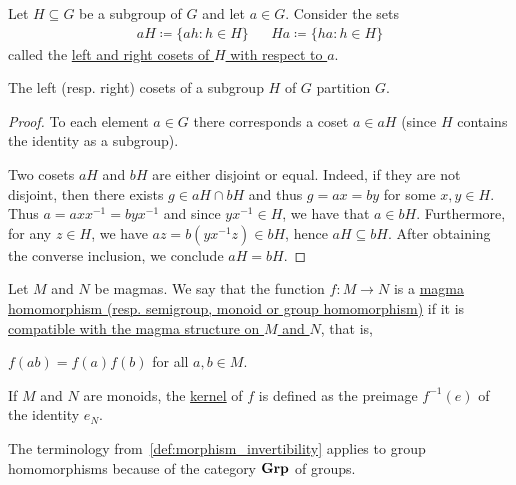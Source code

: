 \begin{definition}\label{def:group_cosets}
  Let $H \subseteq G$ be a subgroup of $G$ and let $a \in G$. Consider the sets
  \begin{align*}
    aH \coloneqq \{ ah \colon h \in H \}
    &&
    Ha \coloneqq \{ ha \colon h \in H \}
  \end{align*}
  called the \ul{left and right cosets of $H$ with respect to $a$}.
\end{definition}

\begin{proposition}\label{thm:coset_partition}
  The left (resp. right) cosets of a subgroup $H$ of $G$ partition $G$.
\end{proposition}
\begin{proof}
  To each element $a \in G$ there corresponds a coset $a \in aH$ (since $H$ contains the identity as a subgroup).

  Two cosets $aH$ and $bH$ are either disjoint or equal. Indeed, if they are not disjoint, then there exists $g \in aH \cap bH$ and thus $g = ax = by$ for some $x, y \in H$. Thus $a = a x x^{-1} = b y x^{-1}$ and since $y x^{-1} \in H$, we have that $a \in bH$. Furthermore, for any $z \in H$, we have $az = b(y x^{-1} z) \in bH$, hence $aH \subseteq bH$. After obtaining the converse inclusion, we conclude $aH = bH$.
\end{proof}

\begin{definition}\label{def:group_homomorphism}
  Let $M$ and $N$ be magmas. We say that the function $f: M \to N$ is a \ul{magma homomorphism (resp. semigroup, monoid or group homomorphism)} if it is \ul{compatible with the magma structure on $M$ and $N$}, that is,
  \begin{description}
     $f(ab) = f(a) f(b)$ for all $a, b \in M$.
  \end{description}

  If $M$ and $N$ are monoids, the \ul{kernel} of $f$ is defined as the preimage $f^{-1}(e)$ of the identity $e_N$.

  The terminology from~\cref{def:morphism_invertibility} applies to group homomorphisms because of the category $\operatorname{\mathbf{Grp}}$ of groups.
\end{definition}


